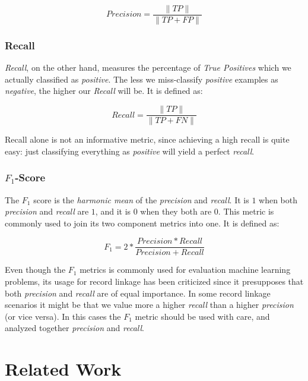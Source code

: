 \documentclass[epsfig,a4paper,11pt,titlepage,twoside,openany]{book}
\begin{document}
$$
Precision = \frac{\|TP\|}{\|TP + FP\|}
$$
  


\subsubsection{Recall}
\label{sec:evaluation-metric-recall}

\textit{Recall}, on the other hand, measures the percentage of \textit{True
  Positives} which we actually classified as \textit{positive}. The less we
miss-classify \textit{positive} examples as \textit{negative}, the higher our
\textit{Recall} will be. It is defined as:

$$
Recall = \frac{\|TP\|}{\|TP + FN\|}
$$

Recall alone is not an informative metric, since achieving a high recall is
quite easy: just classifying everything as \textit{positive} will yield a
perfect \textit{recall}.



\subsubsection{$F_1$-Score}
\label{sec:evaluation-metric-f1}

The $F_1$ score is the \textit{harmonic mean} of the \textit{precision} and
\textit{recall}. It is $1$ when both \textit{precision} and \textit{recall} are
$1$, and it is $0$ when they both are $0$. This metric is commonly used to join
its two component metrics into one. It is defined as:

$$
F_1 = 2 * \frac{Precision * Recall}{Precision + Recall}
$$

Even though the $F_1$ metrics is commonly used for evaluation machine learning
problems, its usage for record linkage has been criticized
\cite{hand17_note_using_f_measur_evaluat} since it presupposes that both
\textit{precision} and \textit{recall} are of equal importance. In some record
linkage scenarios it might be that we value more a higher \textit{recall} than a
higher \textit{precision} (or vice versa). In this cases the $F_1$ metric should
be used with care, and analyzed together \textit{precision} and \textit{recall}.



\section{Related Work}
\label{sec:rl-related-work}
\end{document}

